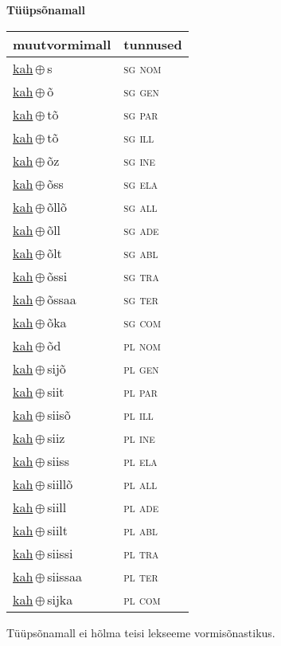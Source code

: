

\vspace{3.5em}
\noindent \begin{minipage}{\textwidth}
\noindent \textbf{Tüüpsõnamall \,}\\

\begin{sideways}
\begin{tabular}{l l}
muutvormimall & tunnused \\
\hline
\underline{kah}\,$\oplus$\,s & \textsc{ sg nom } \\
\underline{kah}\,$\oplus$\,õ & \textsc{ sg gen } \\
\underline{kah}\,$\oplus$\,tõ & \textsc{ sg par } \\
\underline{kah}\,$\oplus$\,tõ & \textsc{ sg ill } \\
\underline{kah}\,$\oplus$\,õz & \textsc{ sg ine } \\
\underline{kah}\,$\oplus$\,õss & \textsc{ sg ela } \\
\underline{kah}\,$\oplus$\,õllõ & \textsc{ sg all } \\
\underline{kah}\,$\oplus$\,õll & \textsc{ sg ade } \\
\underline{kah}\,$\oplus$\,õlt & \textsc{ sg abl } \\
\underline{kah}\,$\oplus$\,õssi & \textsc{ sg tra } \\
\underline{kah}\,$\oplus$\,õssaa & \textsc{ sg ter } \\
\underline{kah}\,$\oplus$\,õka & \textsc{ sg com } \\
\underline{kah}\,$\oplus$\,õd & \textsc{ pl nom } \\
\underline{kah}\,$\oplus$\,sijõ & \textsc{ pl gen } \\
\underline{kah}\,$\oplus$\,siit & \textsc{ pl par } \\
\underline{kah}\,$\oplus$\,siisõ & \textsc{ pl ill } \\
\underline{kah}\,$\oplus$\,siiz & \textsc{ pl ine } \\
\underline{kah}\,$\oplus$\,siiss & \textsc{ pl ela } \\
\underline{kah}\,$\oplus$\,siillõ & \textsc{ pl all } \\
\underline{kah}\,$\oplus$\,siill & \textsc{ pl ade } \\
\underline{kah}\,$\oplus$\,siilt & \textsc{ pl abl } \\
\underline{kah}\,$\oplus$\,siissi & \textsc{ pl tra } \\
\underline{kah}\,$\oplus$\,siissaa & \textsc{ pl ter } \\
\underline{kah}\,$\oplus$\,sijka & \textsc{ pl com } \\
\end{tabular}
\end{sideways}
\label{tab:tüüpsõnamall-kahs}

\end{minipage}

 
\vspace{1em}
\noindent Tüüpsõnamall  ei hõlma teisi lekseeme vormi\-sõnastikus.
